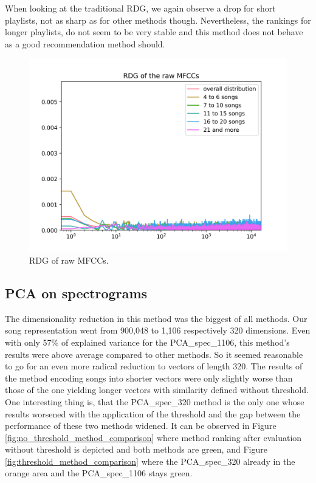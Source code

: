  When looking at the traditional RDG, we again observe a drop for short playlists, not as sharp as for other methods though. Nevertheless, the rankings for longer playlists, do not seem to be very stable and this method does not behave as a good recommendation method should.
 
\begin{figure}[H]
    \centering
	\includegraphics[width=120mm]{./img/mfcc_graph.png}
	\caption{RDG of raw MFCCs.}
	\label{fig:mfcc_graph}
\end{figure}

\subsection{PCA on spectrograms}\label{ssec:pca_spec_results}



The dimensionality reduction in this method was the biggest of all methods. Our song representation went from 900,048 to 1,106 respectively 320 dimensions.
Even with only 57\% of explained variance for the PCA\_spec\_1106, this method's results were above average compared to other methods. So it seemed reasonable to go for an even more radical reduction to vectors of length 320. The results of the method encoding songs into shorter vectors were only slightly worse than those of the one yielding longer vectors with similarity defined without threshold. One interesting thing is, that the PCA\_spec\_320 method is the only one whose results worsened with the application of the threshold and the gap between the performance of these two methods widened. It can be observed in Figure \ref{fig:no_threshold_method_comparison} where method ranking after evaluation without threshold is depicted and both methods are green, and Figure \ref{fig:threshold_method_comparison} where the PCA\_spec\_320 already in the orange area and the PCA\_spec\_1106 stays green.

